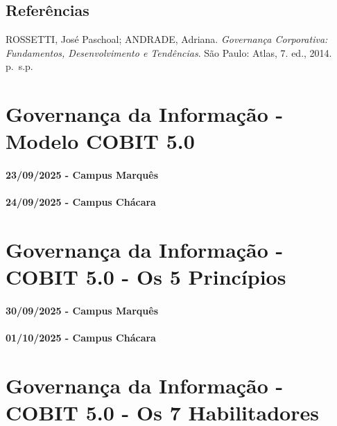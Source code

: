 \documentclass[
]{book}
\begin{document}
\section{Referências}\label{referuxeancias-4}

ROSSETTI, José Paschoal; ANDRADE, Adriana. \emph{Governança Corporativa: Fundamentos, Desenvolvimento e Tendências}. São Paulo: Atlas, 7. ed., 2014. p.~s.p.

\chapter{Governança da Informação - Modelo COBIT 5.0}\label{governanuxe7a-da-informauxe7uxe3o---modelo-cobit-5.0}

\subsubsection*{23/09/2025 - Campus Marquês}\label{campus-marquuxeas-6}

\subsubsection*{24/09/2025 - Campus Chácara}\label{campus-chuxe1cara-6}

\chapter{Governança da Informação - COBIT 5.0 - Os 5 Princípios}\label{governanuxe7a-da-informauxe7uxe3o---cobit-5.0---os-5-princuxedpios}

\subsubsection*{30/09/2025 - Campus Marquês}\label{campus-marquuxeas-7}

\subsubsection*{01/10/2025 - Campus Chácara}\label{campus-chuxe1cara-7}

\chapter{Governança da Informação - COBIT 5.0 - Os 7 Habilitadores}\label{governanuxe7a-da-informauxe7uxe3o---cobit-5.0---os-7-habilitadores}
\end{document}
